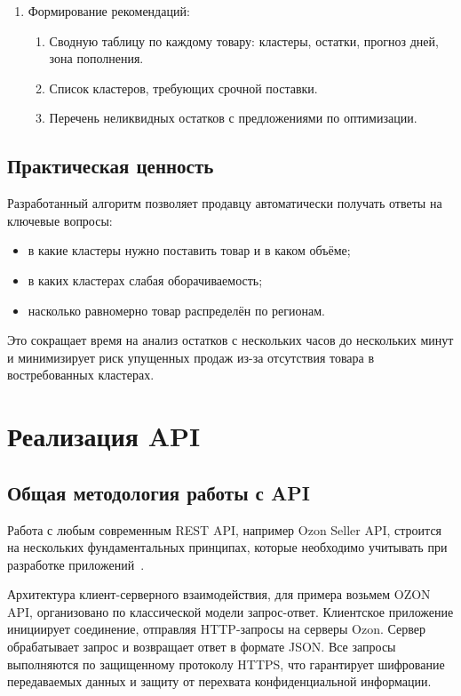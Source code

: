 \begin{enumerate}
Товары с низкой ликвидностью и большими остатками маркируются как «замороженный запас» — рекомендуется уценка или перемещение в более востребованные кластеры.

\item Формирование рекомендаций:
\begin{enumerate}
\item Сводную таблицу по каждому товару: кластеры, остатки, прогноз дней, зона пополнения.
\item Список кластеров, требующих срочной поставки.
\item Перечень неликвидных остатков с предложениями по оптимизации.
\end{enumerate}

\end{enumerate}

\subsection{Практическая ценность}

Разработанный алгоритм позволяет продавцу автоматически получать ответы на ключевые вопросы:

\begin{itemize}
\item в какие кластеры нужно поставить товар и в каком объёме;
\item в каких кластерах слабая оборачиваемость;
\item насколько равномерно товар распределён по регионам.
\end{itemize}

Это сокращает время на анализ остатков с нескольких часов до нескольких минут и минимизирует риск упущенных продаж из-за отсутствия товара в востребованных кластерах.

\section{Реализация API}

\subsection{Общая методология работы с API}

Работа с любым современным REST API, например Ozon Seller API, строится на нескольких фундаментальных принципах, которые необходимо учитывать при разработке приложений~\cite{ozonSellerAPI}.

Архитектура клиент-серверного взаимодействия, для примера возьмем OZON API, организовано по классической модели запрос-ответ. Клиентское приложение инициирует соединение, отправляя HTTP-запросы на серверы Ozon. Сервер обрабатывает запрос и возвращает ответ в формате JSON. Все запросы выполняются по защищенному протоколу HTTPS, что гарантирует шифрование передаваемых данных и защиту от перехвата конфиденциальной информации.

